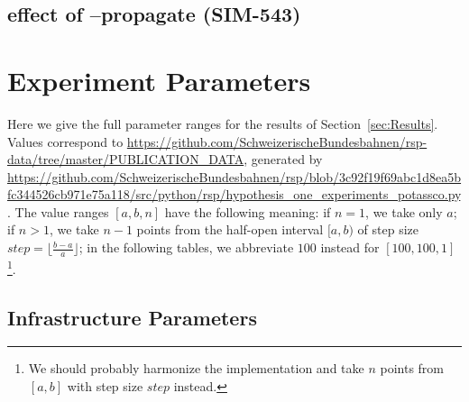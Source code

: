 \documentclass{article}
\begin{document}
\subsection{effect of --propagate (SIM-543)}






\section{Experiment Parameters}\label{subsec:experiment_parameters}

Here we give the full parameter ranges for the results of Section~\ref{sec:Results}.
Values correspond to \url{https://github.com/SchweizerischeBundesbahnen/rsp-data/tree/master/PUBLICATION_DATA}, generated by \url{https://github.com/SchweizerischeBundesbahnen/rsp/blob/3c92f19f69abc1d8ea5bfc344526cb971e75a118/src/python/rsp/hypothesis_one_experiments_potassco.py}.
The value ranges $[a, b, n]$ have the following meaning:
if $n=1$, we take only $a$; if $n>1$, we take $n-1$ points from the half-open interval $[a,b)$ of step size $step=\lfloor \frac{b-a}{a}\rfloor$; in the following tables, we abbreviate $100$ instead for $[100, 100, 1]$\footnote{We should probably harmonize the implementation and take $n$ points from $[a,b]$ with step size $step$ instead.}.

\subsection{Infrastructure Parameters}
\end{document}
